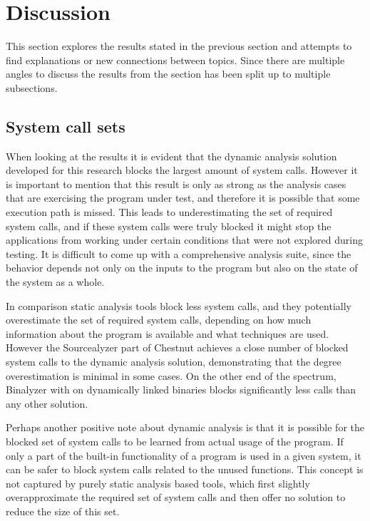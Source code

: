 \section{Discussion}
This section explores the results stated in the previous section and attempts to find explanations or new connections between topics. Since there are multiple angles to discuss the results from the section has been split up to multiple subsections.

\subsection {System call sets}
When looking at the results it is evident that the dynamic analysis solution developed for this research blocks the largest amount of system calls.
However it is important to mention that this result is only as strong as the analysis cases that are exercising the program under test, and therefore it is possible that some execution path is missed.
This leads to underestimating the set of required system calls, and if these system calls were truly blocked it might stop the applications from working under certain conditions that were not explored during testing.
It is difficult to come up with a comprehensive analysis suite, since the behavior depends not only on the inputs to the program but also on the state of the system as a whole.

In comparison static analysis tools block less system calls, and they potentially overestimate the set of required system calls, depending on how much information about the program is available and what techniques are used.
However the Sourcealyzer part of Chestnut achieves a close number of blocked system calls to the dynamic analysis solution, demonstrating that the degree overestimation is minimal in some cases.
On the other end of the spectrum, Binalyzer with  on dynamically linked binaries blocks significantly less calls than any other solution.

Perhaps another positive note about dynamic analysis is that it is possible for the blocked set of system calls to be learned from actual usage of the program. If only a part of the built-in functionality of a program is used in a given system, it can be safer to block system calls related to the unused functions. This concept is not captured by purely static analysis based tools, which first slightly overapproximate the required set of system calls and then offer no solution to reduce the size of this set.

